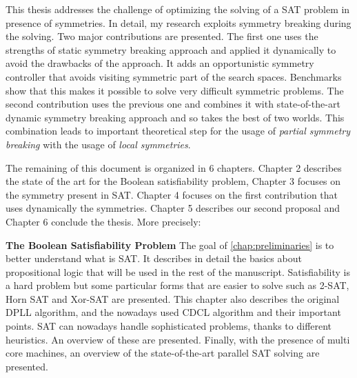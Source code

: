 %
%
%
This thesis addresses the challenge of optimizing the solving of a SAT problem in presence of
symmetries. In detail, my research exploits symmetry breaking during the solving.
Two major contributions are presented. The first one uses the strengths of static symmetry 
breaking approach and applied it dynamically to avoid the drawbacks of the approach. It adds an opportunistic symmetry controller that avoids visiting symmetric part of the search spaces. Benchmarks show that this makes it possible
 to solve very difficult symmetric problems.
The second contribution uses the previous one and combines it with state-of-the-art dynamic 
symmetry breaking approach and so takes the best of two worlds. This combination leads to 
important theoretical step for the usage of \emph{partial symmetry breaking} with the usage of 
\emph{local symmetries}. 
 
The remaining of this document is organized in 6 chapters. Chapter 2 describes the state of
the art for the Boolean satisfiability problem, Chapter 3 focuses on the symmetry present in SAT.
Chapter 4 focuses on the first contribution that uses dynamically the symmetries.
Chapter 5 describes our second proposal and Chapter 6 conclude the thesis. More precisely:
 
\textbf{The Boolean Satisfiability Problem}
The goal of \cref{chap:preliminaries} is to better understand what is SAT. 
It describes in detail the basics
about propositional logic that will be used in the rest of the manuscript. Satisfiability is a hard
problem but some particular forms that are easier to solve such as 2-SAT, Horn SAT and Xor-SAT are presented.
This chapter also describes  the original DPLL algorithm, and the
nowadays used CDCL algorithm and their important points. SAT can nowadays handle
sophisticated problems, thanks to different heuristics.
 An overview of these are presented. Finally, with the presence of multi
core machines, an overview of the state-of-the-art parallel SAT solving are presented.

